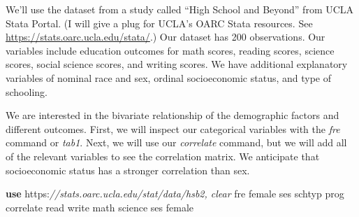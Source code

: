 \documentclass[
]{book}
\newenvironment{Shaded}{\begin{snugshade}}{\end{snugshade}}
\newcommand{\CommentTok}[1]{\textcolor[rgb]{0.56,0.35,0.01}{\textit{#1}}}
\newcommand{\KeywordTok}[1]{\textcolor[rgb]{0.13,0.29,0.53}{\textbf{#1}}}
\newcommand{\NormalTok}[1]{#1}
\begin{document}
We'll use the dataset from a study called ``High School and Beyond'' from UCLA Stata Portal. (I will give a plug for UCLA's OARC Stata resources. See \url{https://stats.oarc.ucla.edu/stata/}.) Our dataset has 200 observations. Our variables include education outcomes for math scores, reading scores, science scores, social science scores, and writing scores. We have additional explanatory variables of nominal race and sex, ordinal socioeconomic status, and type of schooling.

We are interested in the bivariate relationship of the demographic factors and different outcomes. First, we will inspect our categorical variables with the \emph{fre} command or \emph{tab1}. Next, we will use our \emph{correlate} command, but we will add all of the relevant variables to see the correlation matrix. We anticipate that socioeconomic status has a stronger correlation than sex.

\begin{Shaded}
\begin{Highlighting}[]
\KeywordTok{use}\NormalTok{ https:}\CommentTok{//stats.oarc.ucla.edu/stat/data/hsb2, clear}
\NormalTok{fre female ses schtyp prog}
\NormalTok{correlate read write math science ses female}
\end{Highlighting}
\end{Shaded}
\end{document}
